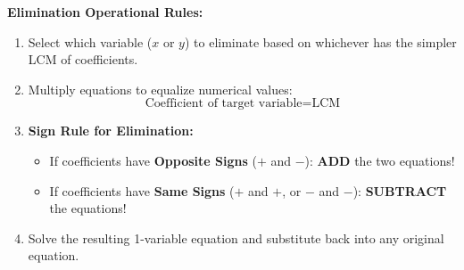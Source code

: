 \documentclass[10pt,a4paper]{article}
\begin{document}
\begin{minipage}[c]{0.52\textwidth}
\begin{formulaBox}
  \textbf{Elimination Operational Rules:}
  \begin{enumerate}
    \item Select which variable ($x$ or $y$) to eliminate based on whichever has the simpler LCM of coefficients.
    \item Multiply equations to equalize numerical values:
      $$\text{Coefficient of target variable} = \text{LCM}$$
    \item \textbf{Sign Rule for Elimination:}
      \begin{itemize}
        \item If coefficients have \textbf{Opposite Signs} ($+$ and $-$): \textbf{ADD} the two equations!
        \item If coefficients have \textbf{Same Signs} ($+$ and $+$, or $-$ and $-$): \textbf{SUBTRACT} the equations!
      \end{itemize}
    \item Solve the resulting 1-variable equation and substitute back into any original equation.
  \end{enumerate}
\end{formulaBox}
\end{minipage}\hfill
\begin{minipage}[c]{0.45\textwidth}
\centering
{}
\end{minipage}
\end{document}
